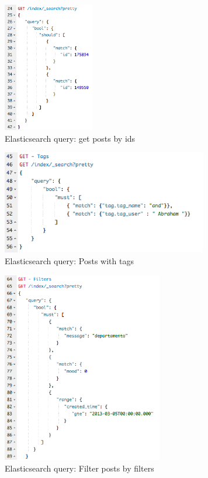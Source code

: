 \begin{figure}[ht!]
	\centering
	\includegraphics[width=40mm]{Imagens/es-get-posts-by-ids.png}
	\caption{Elasticsearch query: get posts by ids\label{fig:es-query-es-get-posts-by-ids}}
\end{figure}

\begin{figure}[ht!]
	\centering
	\includegraphics[width=90mm]{Imagens/es-get-tags.png}
	\caption{Elasticsearch query: Posts with tags \label{fig:es-query-es-get-tags}}
\end{figure}


\begin{figure}[ht!]
	\centering
	\includegraphics[width=70mm]{Imagens/es-get-filters.png}
	\caption{Elasticsearch query: Filter posts by filters \label{fig:es-get-filters}}
\end{figure}

